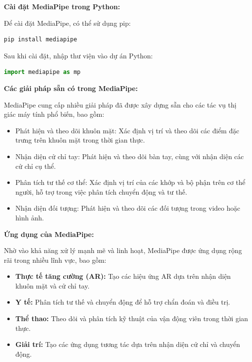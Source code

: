 \textbf{Cài đặt MediaPipe trong Python:}

Để cài đặt MediaPipe, có thể sử dụng pip:

\begin{lstlisting}[language=python,caption={Đoạn code cài đặt thư viện MediaPipe}]
pip install mediapipe
\end{lstlisting}

Sau khi cài đặt, nhập thư viện vào dự án Python:

\begin{lstlisting}[language=python,caption={Đoạn code cài đặt thư viện MediaPipe}]
import mediapipe as mp
\end{lstlisting}

\textbf{Các giải pháp sẵn có trong MediaPipe:}

MediaPipe cung cấp nhiều giải pháp đã được xây dựng sẵn cho các tác vụ thị giác máy tính phổ biến, bao gồm: \cite{mediapipe}

\begin{itemize}
    \item Phát hiện và theo dõi khuôn mặt: Xác định vị trí và theo dõi các điểm đặc trưng trên khuôn mặt trong thời gian thực.
    \item Nhận diện cử chỉ tay: Phát hiện và theo dõi bàn tay, cùng với nhận diện các cử chỉ cụ thể. \cite{vohungvi}
    \item Phân tích tư thế cơ thể: Xác định vị trí của các khớp và bộ phận trên cơ thể người, hỗ trợ trong việc phân tích chuyển động và tư thế.
    \item Nhận diện đối tượng: Phát hiện và theo dõi các đối tượng trong video hoặc hình ảnh.
\end{itemize}

\textbf{Ứng dụng của MediaPipe:}

Nhờ vào khả năng xử lý mạnh mẽ và linh hoạt, MediaPipe được ứng dụng rộng rãi trong nhiều lĩnh vực, bao gồm:

\begin{itemize}
    \item \textbf{Thực tế tăng cường (AR):} Tạo các hiệu ứng AR dựa trên nhận diện khuôn mặt và cử chỉ tay.
    \item \textbf{Y tế:} Phân tích tư thế và chuyển động để hỗ trợ chẩn đoán và điều trị.
    \item \textbf{Thể thao:} Theo dõi và phân tích kỹ thuật của vận động viên trong thời gian thực. \cite{gfg_mediapipe}
    \item \textbf{Giải trí:} Tạo các ứng dụng tương tác dựa trên nhận diện cử chỉ và chuyển động.
\end{itemize}

